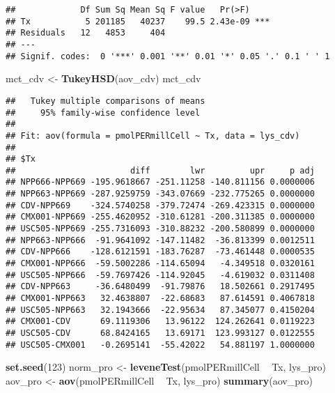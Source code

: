\documentclass[]{article}
\newenvironment{Shaded}{\begin{snugshade}}{\end{snugshade}}
\newcommand{\DecValTok}[1]{\textcolor[rgb]{0.00,0.00,0.81}{#1}}
\newcommand{\KeywordTok}[1]{\textcolor[rgb]{0.13,0.29,0.53}{\textbf{#1}}}
\newcommand{\NormalTok}[1]{#1}
\newcommand{\OperatorTok}[1]{\textcolor[rgb]{0.81,0.36,0.00}{\textbf{#1}}}
\newcommand{\StringTok}[1]{\textcolor[rgb]{0.31,0.60,0.02}{#1}}
\begin{document}
\begin{verbatim}
##             Df Sum Sq Mean Sq F value   Pr(>F)    
## Tx           5 201185   40237    99.5 2.43e-09 ***
## Residuals   12   4853     404                     
## ---
## Signif. codes:  0 '***' 0.001 '**' 0.01 '*' 0.05 '.' 0.1 ' ' 1
\end{verbatim}

\begin{Shaded}
\begin{Highlighting}[]
\NormalTok{mct_cdv <-}\StringTok{ }\KeywordTok{TukeyHSD}\NormalTok{(aov_cdv)}
\NormalTok{mct_cdv}
\end{Highlighting}
\end{Shaded}

\begin{verbatim}
##   Tukey multiple comparisons of means
##     95% family-wise confidence level
## 
## Fit: aov(formula = pmolPERmillCell ~ Tx, data = lys_cdv)
## 
## $Tx
##                       diff        lwr         upr     p adj
## NPP666-NPP669 -195.9618667 -251.11258 -140.811156 0.0000006
## NPP663-NPP669 -287.9259759 -343.07669 -232.775265 0.0000000
## CDV-NPP669    -324.5740258 -379.72474 -269.423315 0.0000000
## CMX001-NPP669 -255.4620952 -310.61281 -200.311385 0.0000000
## USC505-NPP669 -255.7316093 -310.88232 -200.580899 0.0000000
## NPP663-NPP666  -91.9641092 -147.11482  -36.813399 0.0012511
## CDV-NPP666    -128.6121591 -183.76287  -73.461448 0.0000535
## CMX001-NPP666  -59.5002286 -114.65094   -4.349518 0.0320161
## USC505-NPP666  -59.7697426 -114.92045   -4.619032 0.0311408
## CDV-NPP663     -36.6480499  -91.79876   18.502661 0.2917495
## CMX001-NPP663   32.4638807  -22.68683   87.614591 0.4067818
## USC505-NPP663   32.1943666  -22.95634   87.345077 0.4150204
## CMX001-CDV      69.1119306   13.96122  124.262641 0.0119223
## USC505-CDV      68.8424165   13.69171  123.993127 0.0122555
## USC505-CMX001   -0.2695141  -55.42022   54.881197 1.0000000
\end{verbatim}

\begin{Shaded}
\begin{Highlighting}[]
\KeywordTok{set.seed}\NormalTok{(}\DecValTok{123}\NormalTok{)}
\NormalTok{norm_pro <-}\StringTok{ }\KeywordTok{leveneTest}\NormalTok{(pmolPERmillCell }\OperatorTok{~}\StringTok{ }\NormalTok{Tx, lys_pro)}
\NormalTok{aov_pro <-}\StringTok{ }\KeywordTok{aov}\NormalTok{(pmolPERmillCell }\OperatorTok{~}\StringTok{ }\NormalTok{Tx, lys_pro)}
\KeywordTok{summary}\NormalTok{(aov_pro)}
\end{Highlighting}
\end{Shaded}
\end{document}
